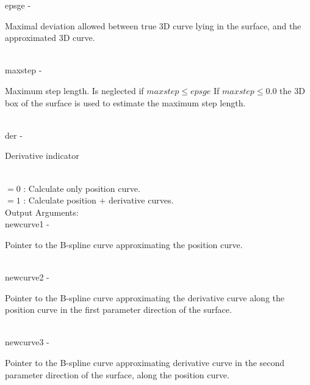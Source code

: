         \>\>    {\fov epsge}\> - \>     \begin{minipg2}
                                Maximal deviation allowed between true 3D curve lying in the surface,
                                and the approximated 3D curve.
                                \end{minipg2}\\[0.3ex]
        \>\>    {\fov maxstep}\> - \>   \begin{minipg2}
                                Maximum step length. Is neglected if
                                $maxstep \leq epsge$ If
                                $maxstep \leq 0.0$ the 3D box of the
                                surface is used to estimate the maximum step length.
                                \end{minipg2} \\[0.3ex]
        \>\>    {\fov der}      \> - \>         \begin{minipg2}
                                Derivative indicator
                                \end{minipg2}\\
                \>\>\>\>\>      $= 0$ : Calculate only position curve.\\
                \>\>\>\>\>      $= 1$ : Calculate position + derivative curves.\\
        \>Output Arguments:\\
        \>\>    {\fov newcurve1}\> - \> \begin{minipg2}
                                Pointer to the B-spline curve
                                approximating the position curve.
                                \end{minipg2}\\
        \>\>    {\fov newcurve2}\> - \> \begin{minipg2}
                                Pointer to the B-spline curve
                                approximating the derivative curve along
                                the position curve in the first
                                parameter direction of the surface.
                                \end{minipg2}\\[0.8ex]
        \>\>    {\fov newcurve3}\> - \> \begin{minipg2}
                                Pointer to the B-spline curve
                                approximating derivative curve in
                                the second parameter direction of the
                                surface, along the position curve.
                                \end{minipg2}\\
